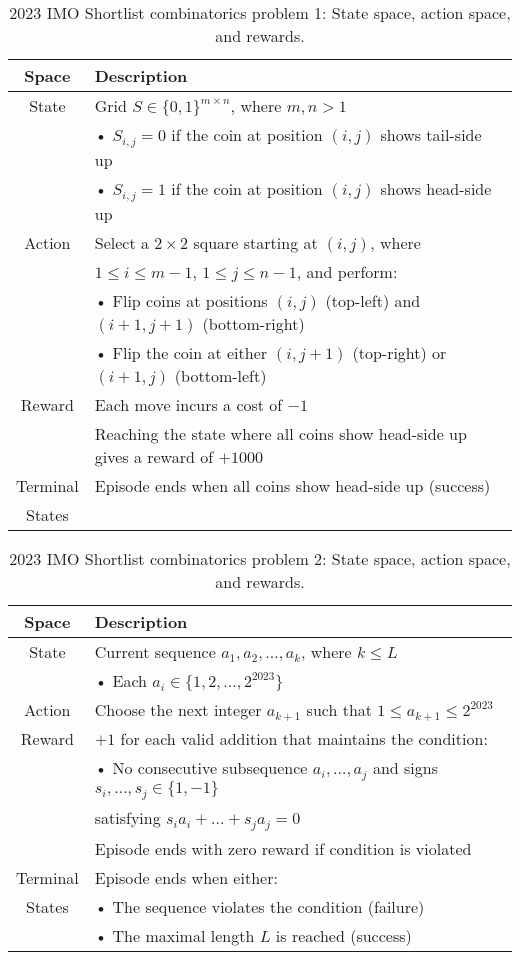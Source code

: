 \begin{table}[htb]
\caption{2023 IMO Shortlist combinatorics problem 1: State space, action space, and rewards.}
  \centering
  \small
\begin{tabular}{cl}
  \toprule
Space    & Description \\
\midrule
State    & Grid $S \in \{0,1\}^{m \times n}$, where $m,n > 1$ \\
         & • $S_{i,j} = 0$ if the coin at position $(i,j)$ shows tail-side up \\
         & • $S_{i,j} = 1$ if the coin at position $(i,j)$ shows head-side up \\
Action   & Select a $2 \times 2$ square starting at $(i,j)$, where \\
         & $1 \leq i \leq m-1$, $1 \leq j \leq n-1$, and perform: \\
         & • Flip coins at positions $(i,j)$ (top-left) and $(i+1,j+1)$ (bottom-right) \\
         & • Flip the coin at either $(i,j+1)$ (top-right) or $(i+1,j)$ (bottom-left) \\
Reward   & Each move incurs a cost of $-1$ \\
         & Reaching the state where all coins show head-side up gives a reward of $+1000$ \\
Terminal & Episode ends when all coins show head-side up (success) \\
States   & \\
\bottomrule
\end{tabular}
\end{table}

\begin{table}[htb]
\caption{2023 IMO Shortlist combinatorics problem 2: State space, action space, and rewards.}
  \centering
  \small
\begin{tabular}{cl}
  \toprule
Space    & Description \\
\midrule
State    & Current sequence $a_1, a_2, \ldots, a_k$, where $k \leq L$ \\
         & • Each $a_i \in \{1, 2, \ldots, 2^{2023}\}$ \\
Action   & Choose the next integer $a_{k+1}$ such that $1 \leq a_{k+1} \leq 2^{2023}$ \\
Reward   & $+1$ for each valid addition that maintains the condition: \\
         & • No consecutive subsequence $a_i, \ldots, a_j$ and signs $s_i, \ldots, s_j \in \{1,-1\}$ \\
         &   satisfying $s_i a_i + \ldots + s_j a_j = 0$ \\
         & Episode ends with zero reward if condition is violated \\
Terminal & Episode ends when either: \\
States   & • The sequence violates the condition (failure) \\
         & • The maximal length $L$ is reached (success) \\
\bottomrule
\end{tabular}
\end{table}



